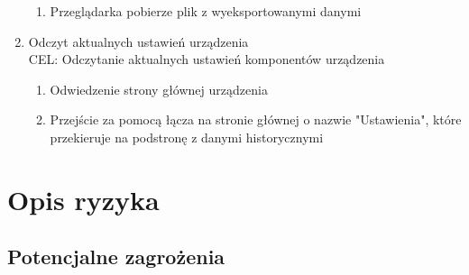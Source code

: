 \documentclass[12pt,a4paper]{article}
\begin{document}
\begin{enumerate}
\begin{enumerate}
        \item Przeglądarka pobierze plik z wyeksportowanymi danymi
    \end{enumerate}
    \item Odczyt aktualnych ustawień urządzenia\\
    CEL: Odczytanie aktualnych ustawień komponentów urządzenia
    \begin{enumerate}
        \item Odwiedzenie strony głównej urządzenia
        \item Przejście za pomocą łącza na stronie głównej o nazwie "Ustawienia", które przekieruje na podstronę z danymi historycznymi
    \end{enumerate}
\end{enumerate}

\section{Opis ryzyka}

\subsection{Potencjalne zagrożenia}
\end{document}
